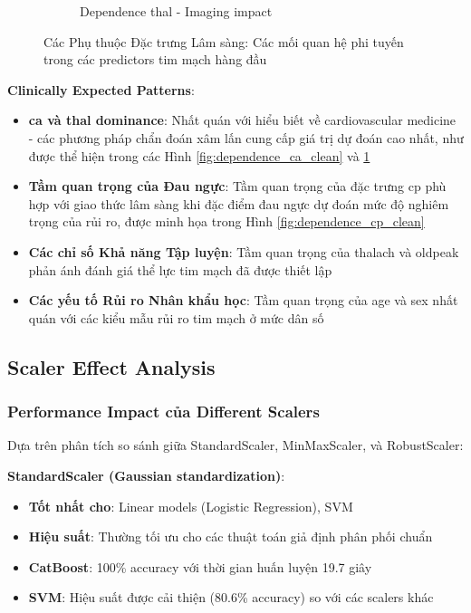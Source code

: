 \begin{figure}[H]
\begin{subfigure}[b]{0.31\textwidth}
\caption{Dependence thal - Imaging impact}
\label{fig:dependence_thal_clean}
\end{subfigure}
\caption{Các Phụ thuộc Đặc trưng Lâm sàng: Các mối quan hệ phi tuyến trong các predictors tim mạch hàng đầu}
\label{fig:clinical_dependencies_optimized}
\end{figure}

\textbf{Clinically Expected Patterns}:
\begin{itemize}
    \item \textbf{ca và thal dominance}: Nhất quán với hiểu biết về cardiovascular medicine - các phương pháp chẩn đoán xâm lấn cung cấp giá trị dự đoán cao nhất, như được thể hiện trong các Hình \ref{fig:dependence_ca_clean} và \ref{fig:dependence_thal_clean}
    \item \textbf{Tầm quan trọng của Đau ngực}: Tầm quan trọng của đặc trưng cp phù hợp với giao thức lâm sàng khi đặc điểm đau ngực dự đoán mức độ nghiêm trọng của rủi ro, được minh họa trong Hình \ref{fig:dependence_cp_clean}
    \item \textbf{Các chỉ số Khả năng Tập luyện}: Tầm quan trọng của thalach và oldpeak phản ánh đánh giá thể lực tim mạch đã được thiết lập
    \item \textbf{Các yếu tố Rủi ro Nhân khẩu học}: Tầm quan trọng của age và sex nhất quán với các kiểu mẫu rủi ro tim mạch ở mức dân số
\end{itemize}

\subsection{Scaler Effect Analysis}\label{subsec:detailed-scaler-analysis}

\subsubsection{Performance Impact của Different Scalers}

Dựa trên phân tích so sánh giữa StandardScaler, MinMaxScaler, và RobustScaler:

\textbf{StandardScaler (Gaussian standardization)}:
\begin{itemize}
    \item \textbf{Tốt nhất cho}: Linear models (Logistic Regression), SVM
    \item \textbf{Hiệu suất}: Thường tối ưu cho các thuật toán giả định phân phối chuẩn
    \item \textbf{CatBoost}: 100\% accuracy với thời gian huấn luyện 19.7 giây
    \item \textbf{SVM}: Hiệu suất được cải thiện (80.6\% accuracy) so với các scalers khác
\end{itemize}

